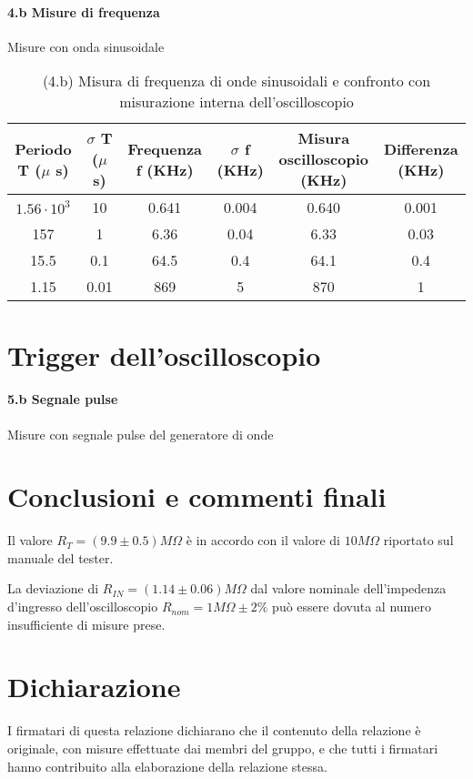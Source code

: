 \documentclass[10pt,a4paper]{article}
\begin{document}
\paragraph{4.b Misure di frequenza}
Misure con onda sinusoidale
\begin{table}[h]
\centering
\begin{tabular}{|c|c|c|c|c|c|}
\hline 
Periodo T ($\mu$ s)& $\sigma$ T ($\mu$ s)  &Frequenza f (KHz) & $\sigma$ f (KHz) & Misura oscilloscopio (KHz) & Differenza (KHz)\\
\hline 
$1.56\cdot 10^3$& 10 & 0.641 & 0.004 & 0.640 &0.001\\
157 & 1 & 6.36 & 0.04& 6.33 &0.03\\
15.5& 0.1 & 64.5 & 0.4 & 64.1 &0.4 \\
1.15 & 0.01 & 869& 5 & 870 &1 \\
\hline 
\end{tabular} 
\caption{(4.b) Misura di frequenza di onde sinusoidali  e confronto con misurazione interna dell'oscilloscopio }
\end{table}


\section{Trigger dell'oscilloscopio}
\paragraph{5.b Segnale pulse}
Misure con segnale pulse del generatore di onde


\clearpage
\section{Conclusioni e commenti finali}
Il valore $R_T = (9.9 \pm  0.5)  M\Omega$ è in accordo con il valore di $10M\Omega$  riportato sul manuale del tester.

La deviazione di $R_{IN}  = (1.14 \pm  0.06)  M\Omega$ dal valore nominale dell'impedenza d'ingresso dell'oscilloscopio $R_{nom}= 1M\Omega \pm 2\% $ può essere dovuta al numero insufficiente di misure prese.

\section*{Dichiarazione}
I firmatari di questa relazione dichiarano che il contenuto della relazione \`e originale, con misure effettuate dai membri del gruppo, e che tutti i firmatari hanno contribuito alla elaborazione della relazione stessa.
\end{document}
